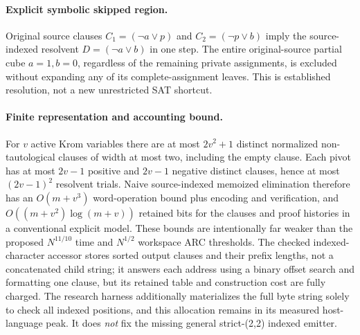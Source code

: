 \documentclass[11pt]{article}
\begin{document}
\paragraph{Explicit symbolic skipped region.} Original source clauses $C_1=(\neg a\lor p)$ and $C_2=(\neg p\lor b)$ imply the source-indexed resolvent $D=(\neg a\lor b)$ in one step. The entire original-source partial cube $a=1,b=0$, regardless of the remaining private assignments, is excluded without expanding any of its complete-assignment leaves. This is established resolution, not a new unrestricted SAT shortcut.

\paragraph{Finite representation and accounting bound.} For $v$ active Krom variables there are at most $2v^2+1$ distinct normalized non-tautological clauses of width at most two, including the empty clause. Each pivot has at most $2v-1$ positive and $2v-1$ negative distinct clauses, hence at most $(2v-1)^2$ resolvent trials. Naive source-indexed memoized elimination therefore has an $O(m+v^3)$ word-operation bound plus encoding and verification, and $O((m+v^2)\log(m+v))$ retained bits for the clauses and proof histories in a conventional explicit model. These bounds are intentionally far weaker than the proposed $N^{11/10}$ time and $N^{1/2}$ workspace ARC thresholds. The checked indexed-character accessor stores sorted output clauses and their prefix lengths, not a concatenated child string; it answers each address using a binary offset search and formatting one clause, but its retained table and construction cost are fully charged. The research harness additionally materializes the full byte string solely to check all indexed positions, and this allocation remains in its measured host-language peak. It does \emph{not} fix the missing general strict-(2,2) indexed emitter.
\end{document}
